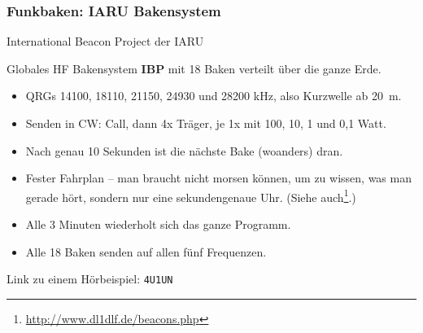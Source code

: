 \begin{frame}
  \frametitle{Funkbaken: IARU Bakensystem}

  \begin{center}
    \Large International Beacon Project der IARU
  \end{center}

  Globales HF Bakensystem \textbf{IBP} mit 18 Baken verteilt über die
  ganze Erde.

  \begin{itemize}[<+->]
    \item QRGs 14100, 18110, 21150, 24930 und 28200 kHz, also Kurzwelle ab 20~m.
    \item Senden in CW: Call, dann 4x Träger, je 1x mit 100, 10, 1 und 0,1 Watt.
    \item Nach genau 10 Sekunden ist die nächste Bake (woanders) dran.
    \item Fester Fahrplan -- man braucht nicht morsen können, um zu wissen, was man gerade hört,
          sondern nur eine sekundengenaue Uhr.  (Siehe auch\footnote{\ExternalLink\url{http://www.dl1dlf.de/beacons.php}}.)
    \item Alle 3 Minuten wiederholt sich das ganze Programm.
    \item Alle 18 Baken senden auf allen fünf Frequenzen.
  \end{itemize}

  \begin{center}
    Link zu einem Hörbeispiel: \texttt{4U1UN} \hyperlink{refs}{\cite{ibp}}
  \end{center}
\end{frame}


